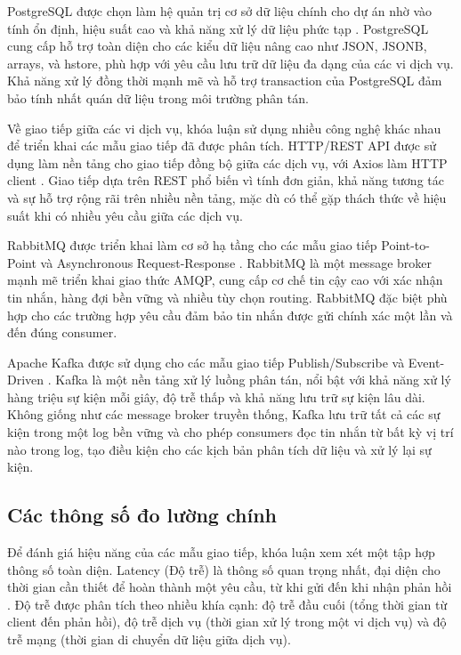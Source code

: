 PostgreSQL được chọn làm hệ quản trị cơ sở dữ liệu chính cho dự án nhờ vào tính ổn định, hiệu suất cao và khả năng xử lý dữ liệu phức tạp \cite{momjian2018}. PostgreSQL cung cấp hỗ trợ toàn diện cho các kiểu dữ liệu nâng cao như JSON, JSONB, arrays, và hstore, phù hợp với yêu cầu lưu trữ dữ liệu đa dạng của các vi dịch vụ. Khả năng xử lý đồng thời mạnh mẽ và hỗ trợ transaction của PostgreSQL đảm bảo tính nhất quán dữ liệu trong môi trường phân tán.

Về giao tiếp giữa các vi dịch vụ, khóa luận sử dụng nhiều công nghệ khác nhau để triển khai các mẫu giao tiếp đã được phân tích. HTTP/REST API được sử dụng làm nền tảng cho giao tiếp đồng bộ giữa các dịch vụ, với Axios làm HTTP client \cite{rodriguez2016}. Giao tiếp dựa trên REST phổ biến vì tính đơn giản, khả năng tương tác và sự hỗ trợ rộng rãi trên nhiều nền tảng, mặc dù có thể gặp thách thức về hiệu suất khi có nhiều yêu cầu giữa các dịch vụ.

RabbitMQ được triển khai làm cơ sở hạ tầng cho các mẫu giao tiếp Point-to-Point và Asynchronous Request-Response \cite{videla2012}. RabbitMQ là một message broker mạnh mẽ triển khai giao thức AMQP, cung cấp cơ chế tin cậy cao với xác nhận tin nhắn, hàng đợi bền vững và nhiều tùy chọn routing. RabbitMQ đặc biệt phù hợp cho các trường hợp yêu cầu đảm bảo tin nhắn được gửi chính xác một lần và đến đúng consumer.

Apache Kafka được sử dụng cho các mẫu giao tiếp Publish/Subscribe và Event-Driven \cite{kreps2011}. Kafka là một nền tảng xử lý luồng phân tán, nổi bật với khả năng xử lý hàng triệu sự kiện mỗi giây, độ trễ thấp và khả năng lưu trữ sự kiện lâu dài. Không giống như các message broker truyền thống, Kafka lưu trữ tất cả các sự kiện trong một log bền vững và cho phép consumers đọc tin nhắn từ bất kỳ vị trí nào trong log, tạo điều kiện cho các kịch bản phân tích dữ liệu và xử lý lại sự kiện.

\subsection{Các thông số đo lường chính}
Để đánh giá hiệu năng của các mẫu giao tiếp, khóa luận xem xét một tập hợp thông số toàn diện. Latency (Độ trễ) là thông số quan trọng nhất, đại diện cho thời gian cần thiết để hoàn thành một yêu cầu, từ khi gửi đến khi nhận phản hồi \cite{jun2018}. Độ trễ được phân tích theo nhiều khía cạnh: độ trễ đầu cuối (tổng thời gian từ client đến phản hồi), độ trễ dịch vụ (thời gian xử lý trong một vi dịch vụ) và độ trễ mạng (thời gian di chuyển dữ liệu giữa dịch vụ).

